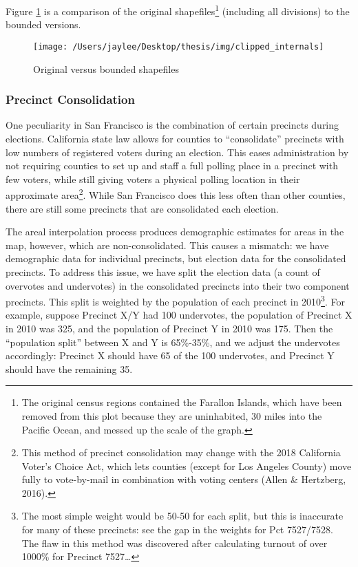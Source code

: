 \documentclass[12pt,twoside]{reedthesis}
\begin{document}
Figure \ref{fig:clipped} is a comparison of the original shapefiles\footnote{The original census regions contained the Farallon Islands, which have been removed from this plot because they are uninhabited, 30 miles into the Pacific Ocean, and messed up the scale of the graph.} (including all divisions) to the bounded versions.
\begin{figure}
\texttt{[image: /Users/jaylee/Desktop/thesis/img/clipped\_internals]} \caption{Original versus bounded shapefiles}\label{fig:clipped}
\end{figure}
\hypertarget{precinct-consolidation}{%
\subsubsection{Precinct Consolidation}\label{precinct-consolidation}}

One peculiarity in San Francisco is the combination of certain precincts during elections. California state law allows for counties to ``consolidate'' precincts with low numbers of registered voters during an election. This eases administration by not requiring counties to set up and staff a full polling place in a precinct with few voters, while still giving voters a physical polling location in their approximate area\footnote{This method of precinct consolidation may change with the 2018 California Voter's Choice Act, which lets counties (except for Los Angeles County) move fully to vote-by-mail in combination with voting centers (Allen \& Hertzberg, 2016).}. While San Francisco does this less often than other counties, there are still some precincts that are consolidated each election.

The areal interpolation process produces demographic estimates for areas in the map, however, which are non-consolidated. This causes a mismatch: we have demographic data for individual precincts, but election data for the consolidated precincts. To address this issue, we have split the election data (a count of overvotes and undervotes) in the consolidated precincts into their two component precincts. This split is weighted by the population of each precinct in 2010\footnote{The most simple weight would be 50-50 for each split, but this is inaccurate for many of these precincts: see the gap in the weights for Pct 7527/7528. The flaw in this method was discovered after calculating turnout of over 1000\% for Precinct 7527\ldots{}}. For example, suppose Precinct X/Y had 100 undervotes, the population of Precinct X in 2010 was 325, and the population of Precinct Y in 2010 was 175. Then the ``population split'' between X and Y is 65\%-35\%, and we adjust the undervotes accordingly: Precinct X should have 65 of the 100 undervotes, and Precinct Y should have the remaining 35.
\end{document}
